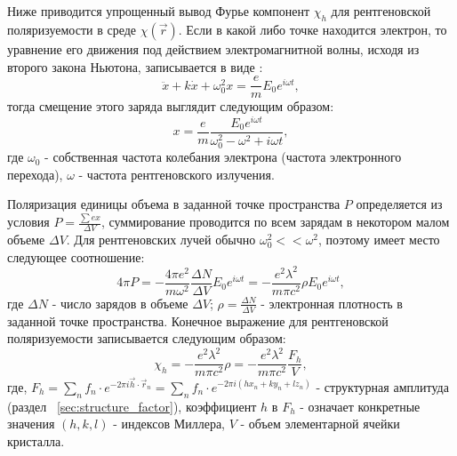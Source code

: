  \section{ }%
  \label{sec:polarizability}

Ниже приводится упрощенный вывод Фурье компонент  $\chi_h$  для рентгеновской
поляризуемости в среде  $\chi(\vec{r})$. Если в какой либо точке находится электрон,
то уравнение его движения под действием электромагнитной волны,
исходя из второго закона Ньютона, записывается в виде \cite{iveronova1972}:
\begin{equation}
  \ddot{x}+ k\dot{x} + \omega_0^2 x = \frac{e}{m}E_0e^{i\omega t},
 \end{equation}
тогда смещение этого заряда выглядит следующим образом:
\begin{equation}
  x = \frac{e}{m} \frac{E_0e^{i\omega t}}{\omega_0^2 - \omega^2+i\omega t},
 \end{equation}
где $\omega_0 $ - собственная частота колебания электрона (частота электронного перехода), $\omega$ - частота рентгеновского излучения.

Поляризация единицы объема в заданной точке пространства $P$ определяется из условия
$P = \frac{\sum e x}{\Delta V}$, суммирование проводится по всем зарядам в
некотором малом объеме  $\Delta V$. Для рентгеновских лучей обычно $\omega_0^2 << \omega^2$, поэтому имеет место
следующее соотношение:
\begin{equation}
  4\pi P = - \frac{4\pi e^2}{m\omega^2}\frac{\Delta N}{\Delta V} E_0 e^{i\omega t} = -\frac{e^2 \lambda^2}{m \pi c^2} \rho E_0 e^{i\omega t},
 \end{equation}
где $\Delta N$ - число зарядов в объеме $\Delta V$;
$\rho = \frac{\Delta N}{\Delta V}$ - электронная плотность в заданной точке пространства. Конечное выражение
для рентгеновской поляризуемости записывается следующим образом:
\begin{equation}
  \chi_h = -\frac{e^2 \lambda^2}{m \pi c^2}  \rho = -\frac{e^2 \lambda^2}{m \pi c^2} \frac{F_h}{V},
 \end{equation}
 где, $ F_h = \sum_{n} f_n \cdot e^{-2\pi i\vec{h}\cdot \vec{r}_n}= \sum_{n} f_n \cdot e^{- 2 \pi i (hx_n+ky_n+lz_n)}$ -
 структурная амплитуда (раздел ~\ref{sec:structure_factor}),
 коэффициент $h$ в $F_h$ - означает конкретные значения $(h,k,l)$ - индексов Миллера, $V$ - объем элементарной ячейки кристалла.
